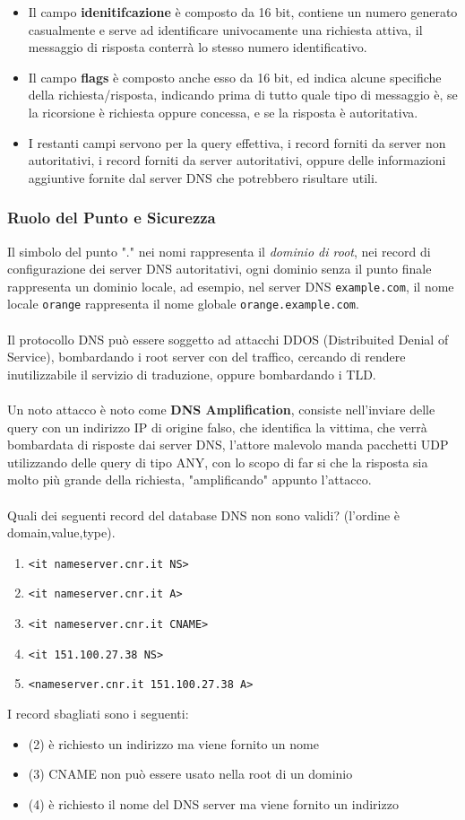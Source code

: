 \documentclass[12pt, letterpaper]{article}
\newcommand{\code}[1]{\colorbox{light-gray}{\texttt{#1}}}
\newcommand{\acc}{\\\hphantom{}\\}
\begin{document}
\begin{itemize}
    \item Il campo \textbf{idenitifcazione} è composto da 16 bit, contiene un numero generato casualmente
          e serve ad identificare univocamente una richiesta attiva, il messaggio di risposta conterrà lo stesso
          numero identificativo.
    \item Il campo \textbf{flags} è composto anche esso da 16 bit, ed indica alcune specifiche della
          richiesta/risposta, indicando prima di tutto quale  tipo di messaggio è, se la ricorsione è richiesta
          oppure concessa, e se la risposta è autoritativa.
    \item I restanti campi servono per la query effettiva, i record forniti
          da server non autoritativi, i record forniti da server
          autoritativi, oppure delle informazioni aggiuntive fornite dal server DNS che potrebbero risultare utili.
\end{itemize}
\subsubsection{Ruolo del Punto e Sicurezza}
Il simbolo del punto "." nei nomi rappresenta il \textit{dominio di root}, nei record di configurazione
dei server DNS autoritativi, ogni dominio senza il punto finale rappresenta un dominio locale, ad esempio,
nel server DNS \code{example.com}, il nome locale \code{orange} rappresenta il nome
globale \code{orange.example.com}.\acc
Il protocollo DNS può essere soggetto ad attacchi DDOS (Distribuited Denial of Service), bombardando i
root server con del traffico, cercando di rendere inutilizzabile il servizio di traduzione, oppure
bombardando i TLD.\acc
Un noto attacco è noto come \textbf{DNS Amplification}, consiste nell'inviare delle query con un indirizzo
IP di origine falso, che identifica la vittima, che verrà bombardata di risposte dai server DNS, l'attore malevolo
manda pacchetti UDP utilizzando delle query di tipo ANY, con lo scopo di far si che la risposta sia
molto più grande della richiesta, "amplificando" appunto l'attacco.\acc
Quali dei seguenti record del database DNS non sono validi? (l'ordine è domain,value,type).\begin{enumerate}
    \item \code{<it nameserver.cnr.it NS>}
    \item \code{<it nameserver.cnr.it A>}
    \item \code{<it nameserver.cnr.it CNAME>}
    \item \code{<it 151.100.27.38 NS>}
    \item \code{<nameserver.cnr.it 151.100.27.38 A>}
\end{enumerate}
I record sbagliati sono i seguenti:\begin{itemize}
    \item \color{red}(2) \color{black} è richiesto un indirizzo ma viene fornito un nome
    \item  \color{red}(3) \color{black} CNAME non può essere usato nella root di un dominio
    \item \color{red}(4) \color{black} è richiesto il nome del DNS server ma viene fornito un indirizzo
\end{itemize}
\end{document}
